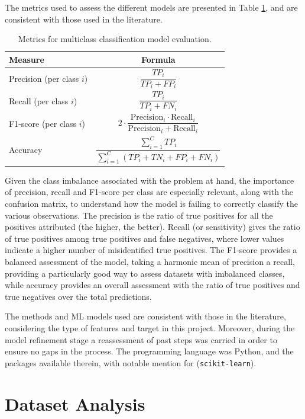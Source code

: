 \documentclass[conference]{IEEEtran}
\begin{document}
The metrics used to assess the different models are presented in Table \ref{evaluationmetrics}, and are consistent with those used in the literature.
\begin{table}[H]
\centering
\caption{Metrics for multiclass classification model evaluation.}
\label{evaluationmetrics}
\begin{tabular}{lc}
\toprule
\textbf{Measure} & \textbf{Formula} \\
\midrule
Precision (per class $i$) & $\dfrac{TP_i}{TP_i + FP_i}$ \\[1em]
Recall (per class $i$) & $\dfrac{TP_i}{TP_i + FN_i}$ \\[1em]
F1-score (per class $i$) & $2 \cdot \dfrac{\text{Precision}_i \cdot \text{Recall}_i}{\text{Precision}_i + \text{Recall}_i}$ \\[1em] 
Accuracy & $\dfrac{\sum_{i=1}^{C} TP_i}{\sum_{i=1}^{C} (TP_i + TN_i + FP_i + FN_i)}$ \\[1em]
\bottomrule
\end{tabular}
\end{table}
Given the class imbalance associated with the problem at hand, the importance of precision, recall and F1-score per class are especially relevant, along with the confusion matrix, to understand how the model is failing to correctly classify the various observations. The precision is the ratio of true positives for all the positives attributed (the higher, the better). Recall (or sensitivity) gives the ratio of true positives among true positives and false negatives, where lower values indicate a higher number of misidentified true positives. The F1-score provides a balanced assessment of the model, taking a harmonic mean of precision a recall, providing a particularly good way to assess datasets with imbalanced classes, while accuracy provides an overall assessment with the ratio of true positives and true negatives over the total predictions.

The methods and ML models used are consistent with those in the literature, considering the type of features and target in this project. Moreover, during the model refinement stage a reassessment of past steps was carried in order to ensure no gaps in the process. The programming language was Python, and the packages available therein, with notable mention for (\texttt{scikit-learn}).

\section{Dataset Analysis}
\end{document}
